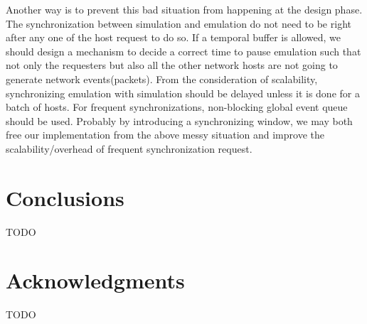 \documentclass{acm_proc_article-sp}
\begin{document}
Another way is to prevent this bad situation from happening at the design phase.
The synchronization between simulation and emulation do not need to be right after any one of the host request to do so.
If a temporal buffer is allowed, we should design a mechanism to decide a correct time to pause emulation such that not only the requesters but also all the other network hosts are not going to generate network events(packets).
From the consideration of scalability, synchronizing emulation with simulation should be delayed unless it is done for a batch of hosts.
For frequent synchronizations, non-blocking global event queue should be used.
Probably by introducing a synchronizing window, we may both free our implementation from the above messy situation and improve the scalability/overhead of frequent synchronization request.
\fi

\section{Conclusions}
TODO

\section{Acknowledgments}
TODO
%


%
%
\balancecolumns
\end{document}
